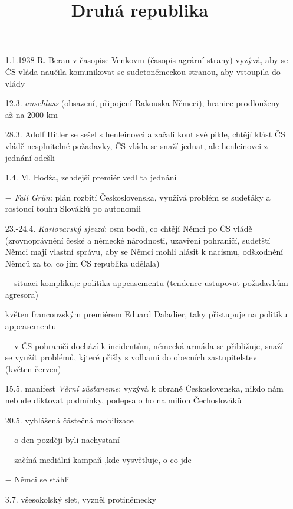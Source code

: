 \documentclass{article}
\title{\vspace{-2cm}Druhá republika\vspace{-1.7cm}}
\date{}
\author{}
\begin{document}
\maketitle

\begin{itemize}
    \vspace{-0.5em}
    \setlength\itemsep{0.15em}
    \item[1.1.1938] R. Beran v časopise Venkovm (časopis agrární strany) vyzývá, aby se ČS vláda naučila komunikovat se sudetoněmeckou stranou, aby vstoupila do vlády
    \item[12.3.] \textit{anschluss} (obsazení, připojení Rakouska Němeci), hranice prodlouženy až na 2000 km
    \item[28.3.] Adolf Hitler se sešel s henleinovci a začali kout své pikle, chtějí klást ČS vládě nesplnitelné požadavky, ČS vláda se snaží jednat, ale henleinovci z jednání odešli
    \item[1.4.] M. Hodža, zehdejší premiér vedl ta jednání
    \item[$-$] \textit{Fall Grün}: plán rozbití Československa, využívá problém se sudeťáky a rostoucí touhu Slováklů po autonomii
    \item[23.-24.4.] \textit{Karlovarský sjezzd}: osm bodů, co chtějí Němci po ČS vládě (zrovnoprávnění české a německé národnosti, uzavření pohraničí, sudetští Němci mají vlastní správu, aby se Němci mohli hlásit k nacismu, odškodnění Němců za to, co jim ČS republika udělala)
    \item[$-$] situaci komplikuje politika appeasementu (tendence ustupovat požadavkům agresora)
    \item[květen] francouzským premiérem Eduard Daladier, taky přistupuje na politiku appeasementu
    \item[$-$] v ČS pohraničí dochází k incidentům, německá armáda se přibližuje, snaží se využít problémů, kjteré přišly s volbami do obecních zastupitelstev (květen-červen)
    \item[15.5.] manifest \textit{Věrní zůstaneme}: vyzývá k obraně Československa, nikdo nám nebude diktovat podmínky, podepsalo ho na milion Čechoslováků
    \item[20.5.] vyhlášená částečná mobilizace
    \item[$-$] o den později byli nachystaní
    \item[$-$] začíná mediální kampaň ,kde vysvětluje, o co jde
    \item[$-$] Němci se stáhli
    \item[3.7.] všesokolský slet, vyzněl protiněmecky

\end{itemize}
\end{document}
